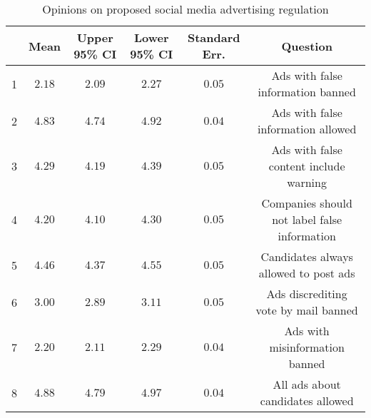 
\begin{table}[!htbp] \centering 
  \caption{Opinions on proposed social media advertising regulation} 
  \label{table:ad-reg2} 
\begin{tabular}{@{\extracolsep{5pt}} cccccc} 
\toprule 
 & Mean & Upper 95\% CI & Lower 95\% CI & Standard Err. & Question \\ 
\midrule 1 & $2.18$ & $2.09$ & $2.27$ & $0.05$ & Ads with false information banned \\ 
2 & $4.83$ & $4.74$ & $4.92$ & $0.04$ & Ads with false information allowed \\ 
3 & $4.29$ & $4.19$ & $4.39$ & $0.05$ & Ads with false content include warning \\ 
4 & $4.20$ & $4.10$ & $4.30$ & $0.05$ & Companies should not label false information \\ 
5 & $4.46$ & $4.37$ & $4.55$ & $0.05$ & Candidates always allowed to post ads \\ 
6 & $3.00$ & $2.89$ & $3.11$ & $0.05$ & Ads discrediting vote by mail banned \\ 
7 & $2.20$ & $2.11$ & $2.29$ & $0.04$ & Ads with misinformation banned \\ 
8 & $4.88$ & $4.79$ & $4.97$ & $0.04$ & All ads about candidates allowed \\ 
\bottomrule 
\end{tabular} 
\end{table} 
